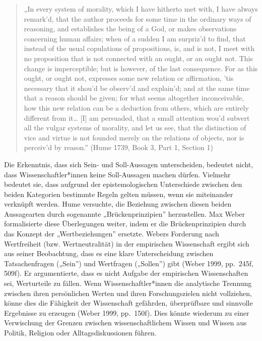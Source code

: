 \documentclass[
  nswissgerman,
  a4paper,
  openany]{book}
\begin{document}
\begin{quote}
„In every system of morality, which I have hitherto met with, I have
always remark'd, that the author proceeds for some time in the ordinary
ways of reasoning, and establishes the being of a God, or makes
observations concerning human affairs; when of a sudden I am surpriz'd
to find, that instead of the usual copulations of propositions, is, and
is not, I meet with no proposition that is not connected with an ought,
or an ought not. This change is imperceptible; but is however, of the
last consequence. For as this ought, or ought not, expresses some new
relation or affirmation, 'tis necessary that it shou'd be observ'd and
explain'd; and at the same time that a reason should be given; for what
seems altogether inconceivable, how this new relation can be a deduction
from others, which are entirely different from it\ldots{} {[}I{]} am
persuaded, that a small attention wou'd subvert all the vulgar systems
of morality, and let us see, that the distinction of vice and virtue is
not founded merely on the relations of objects, nor is perceiv'd by
reason.'' (Hume 1739, Book 3, Part 1, Section 1)
\end{quote}

Die Erkenntnis, dass sich Sein- und Soll-Aussagen unterscheiden,
bedeutet nicht, dass Wissenschaftler*innen keine Soll-Aussagen machen
dürfen. Vielmehr bedeutet sie, dass aufgrund der epistemologischen
Unterschiede zwischen den beiden Kategorien bestimmte Regeln gelten
müssen, wenn sie miteinander verknüpft werden. Hume versuchte, die
Beziehung zwischen diesen beiden Aussagearten durch sogenannte
„Brückenprinzipien'' herzustellen. Max Weber formalisierte diese
Überlegungen weiter, indem er die Brückenprinzipien durch das Konzept
der „Wertbeziehungen'' ersetzte. Webers Forderung nach Wertfreiheit
(bzw. Wertneutralität) in der empirischen Wissenschaft ergibt sich aus
seiner Beobachtung, dass es eine klare Unterscheidung zwischen
Tatsachenfragen („Sein'') und Wertfragen („Sollen'') gibt (Weber 1999,
pp.~245f, 509f). Er argumentierte, dass es nicht Aufgabe der empirischen
Wissenschaften sei, Werturteile zu fällen. Wenn Wissenschaftler*innen
die analytische Trennung zwischen ihren persönlichen Werten und ihren
Forschungszielen nicht vollziehen, könne dies die Fähigkeit der
Wissenschaft gefährden, überprüfbare und sinnvolle Ergebnisse zu
erzeugen (Weber 1999, pp.~150f). Dies könnte wiederum zu einer
Verwischung der Grenzen zwischen wissenschaftlichem Wissen und Wissen
aus Politik, Religion oder Alltagsdiskussionen führen.
\end{document}
